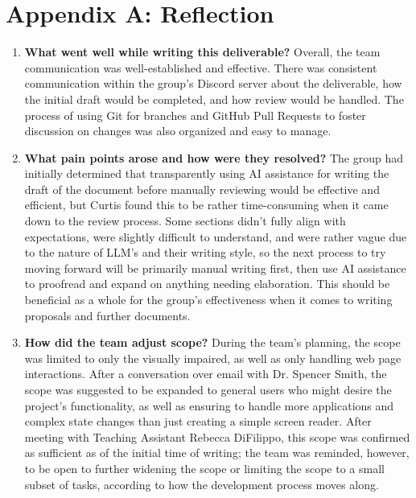 \documentclass[11pt]{article}
\begin{document}
\section*{Appendix A: Reflection}
\begin{enumerate}
\item \textbf{What went well while writing this deliverable?}
Overall, the team communication was well-established and effective. There was consistent communication
within the group's Discord server about the deliverable, how the initial draft would be completed, and how review would be
handled. The process of using Git for branches and GitHub Pull Requests to foster discussion on changes was also organized
and easy to manage.

\item \textbf{What pain points arose and how were they resolved?}
The group had initially determined that transparently using AI assistance for writing the draft of the document before manually
reviewing would be effective and efficient, but Curtis found this to be rather time-consuming when it came down to the review
process. Some sections didn't fully align with expectations, were slightly difficult to understand, and were rather vague due to the nature of LLM's and
their writing style, so the next process to try moving forward will be primarily manual writing first, then use AI assistance to proofread and
expand on anything needing elaboration. This should be beneficial as a whole for the group's effectiveness when it comes to writing
proposals and further documents.

\item \textbf{How did the team adjust scope?}
During the team's planning, the scope was limited to only the visually impaired, as well as only handling web page interactions.
After a conversation over email with Dr. Spencer Smith, the scope was suggested to be expanded to general users who might desire the
project's functionality, as well as ensuring to handle more applications and complex state changes than just creating a simple screen reader.
After meeting with Teaching Assistant Rebecca DiFilippo, this scope was confirmed as sufficient as of the initial time of writing; the team
was reminded, however, to be open to further widening the scope or limiting the scope to a small subset of tasks, according to how the development process moves along.

\end{enumerate}
\end{document}

